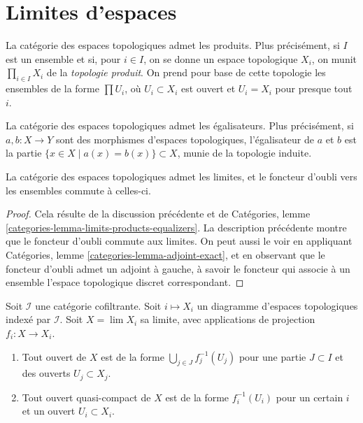 \section{Limites d'espaces}
\label{section-limits}

\noindent
La catégorie des espaces topologiques admet les produits. Plus précisément,
si $I$ est un ensemble et si, pour $i \in I$, on se donne un espace
topologique $X_i$, on munit $\prod_{i \in I} X_i$ de la {\it topologie
produit}. On prend pour base de cette topologie les ensembles de la forme
$\prod U_i$, où $U_i \subset X_i$ est ouvert et $U_i = X_i$ pour presque
tout $i$.

\medskip\noindent
La catégorie des espaces topologiques admet les égalisateurs. Plus
précisément, si $a, b : X \to Y$ sont des morphismes d'espaces topologiques,
l'égalisateur de $a$ et $b$ est la partie
$\{x \in X \mid a(x) = b(x)\} \subset X$, munie de la topologie induite.

\begin{lemma}
\label{lemma-limits}
La catégorie des espaces topologiques admet les limites, et le foncteur
d'oubli vers les ensembles commute à celles-ci.
\end{lemma}

\begin{proof}
Cela résulte de la discussion précédente et de Catégories,
lemme \ref{categories-lemma-limits-products-equalizers}.
La description précédente montre que le foncteur d'oubli commute aux
limites. On peut aussi le voir en appliquant Catégories,
lemme \ref{categories-lemma-adjoint-exact}, et en observant que le foncteur
d'oubli admet un adjoint à gauche, à savoir le foncteur qui associe à un
ensemble l'espace topologique discret correspondant.
\end{proof}

\begin{lemma}
\label{lemma-describe-limits}
Soit $\mathcal{I}$ une catégorie cofiltrante. Soit $i \mapsto X_i$ un
diagramme d'espaces topologiques indexé par $\mathcal{I}$. Soit
$X = \lim X_i$ sa limite, avec applications de projection $f_i : X \to X_i$.
\begin{enumerate}
\item Tout ouvert de $X$ est de la forme $\bigcup_{j \in J} f_j^{-1}(U_j)$
pour une partie $J \subset I$ et des ouverts $U_j \subset X_j$.
\item Tout ouvert quasi-compact de $X$ est de la forme
$f_i^{-1}(U_i)$ pour un certain $i$ et un ouvert $U_i \subset X_i$.
\end{enumerate}
\end{lemma}

